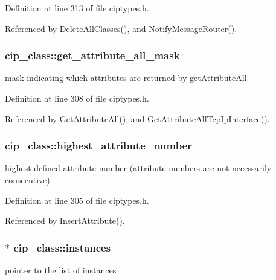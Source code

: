 \-Definition at line 313 of file ciptypes.\-h.



\-Referenced by \-Delete\-All\-Classes(), and \-Notify\-Message\-Router().

\hypertarget{structcip__class_a44da02745b5372357a164e0694c4d3fc}{
\subsubsection[{get\-\_\-attribute\-\_\-all\-\_\-mask}]{ {\bf cip\-\_\-class\-::get\-\_\-attribute\-\_\-all\-\_\-mask}}}\label{da/d8e/structcip__class_a44da02745b5372357a164e0694c4d3fc}
mask indicating which attributes are returned by get\-Attribute\-All 

\-Definition at line 308 of file ciptypes.\-h.



\-Referenced by \-Get\-Attribute\-All(), and \-Get\-Attribute\-All\-Tcp\-Ip\-Interface().

\hypertarget{structcip__class_a13d9a94c9dbbab692255bb458661602c}{
\subsubsection[{highest\-\_\-attribute\-\_\-number}]{ {\bf cip\-\_\-class\-::highest\-\_\-attribute\-\_\-number}}}\label{da/d8e/structcip__class_a13d9a94c9dbbab692255bb458661602c}
highest defined attribute number (attribute numbers are not necessarily consecutive) 

\-Definition at line 305 of file ciptypes.\-h.



\-Referenced by \-Insert\-Attribute().

\hypertarget{structcip__class_a4f6020c15afd9d9947a998a27edcf288}{
\subsubsection[{instances}]{$\ast$ {\bf cip\-\_\-class\-::instances}}}\label{da/d8e/structcip__class_a4f6020c15afd9d9947a998a27edcf288}
pointer to the list of instances 

